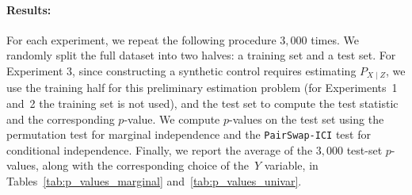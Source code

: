 \documentclass[12pt]{article}
\begin{document}
\begin{table}[ht!]
\centering
{}
\caption{\texttt{PairSwap-ICI} $p$-values, averaged over random $3{,}000$ subsamples with standard errors in parentheses, from Experiments~2 and~3. Values significant at the $0.05$ level are shown in bold.}
\label{tab:p_values_univar}
\end{table}


\paragraph{Results:}
 For each experiment, we repeat the following procedure $3{,}000$ times. We randomly split the full dataset into two halves: a training set and a test set.  For Experiment 3, since constructing a synthetic control requires estimating $P_{X\mid Z}$, we use the training half for this preliminary estimation problem (for Experiments~1 and~2 the training set is not used), and the test set to compute the test statistic and the corresponding $p$-value.
We compute $p$-values on the test set using the permutation test for marginal independence and the \textnormal{\texttt{PairSwap-ICI}} test for conditional independence. Finally, we report the average of the $3{,}000$ test-set $p$-values, along with the corresponding choice of the~$Y$ variable, in Tables~\ref{tab:p_values_marginal} and~\ref{tab:p_values_univar}.
\end{document}
